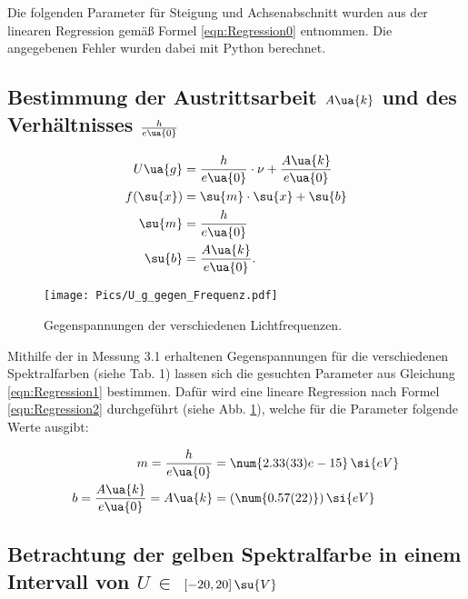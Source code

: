 \newpage

Die folgenden Parameter für Steigung und Achsenabschnitt wurden aus der linearen
Regression gemäß Formel \eqref{eqn:Regression0} entnommen. Die angegebenen Fehler
wurden dabei mit Python berechnet.



\newpage
\newpage

\subsection{Bestimmung der Austrittsarbeit $A\ua{k}$ und des Verhältnisses $\frac{h}{e\ua{0}}$}

\begin{align}
  U\ua{g}   &= \frac{h}{e\ua{0}} \cdot \nu + \frac{A\ua{k}}{e\ua{0}}
  \label{eqn:Regression1} \\
  f(\su{x}) &= \su{m} \cdot \su{x} + \su{b}
  \label{eqn:Regression2} \\
  \su{m}  &= \frac{h}{e\ua{0}}
  \label{eqn:Regression3} \\
  \su{b}  &= \frac{A\ua{k}}{e\ua{0}}.
  \label{eqn:Regression4}
\end{align}

\begin{figure}
  \centering
  \texttt{[image: Pics/U\_g\_gegen\_Frequenz.pdf]}
  \caption{Gegenspannungen der verschiedenen Lichtfrequenzen.}
  \label{fig:Gegenspannung}
\end{figure}

Mithilfe der in Messung 3.1 erhaltenen Gegenspannungen für die verschiedenen
Spektralfarben (siehe Tab. 1) lassen sich die gesuchten
Parameter
aus Gleichung \eqref{eqn:Regression1} bestimmen. Dafür wird eine lineare Regression
nach Formel \eqref{eqn:Regression2} durchgeführt (siehe Abb. \ref{fig:Gegenspannung}),
welche für die Parameter folgende Werte ausgibt:

\begin{align}
  m = \frac{h}{e\ua{0}}                 &= \num{2.33(33)e-15} \, \si{eV}\\
  b = \frac{A\ua{k}}{e\ua{0}} = A\ua{k} &= (\num{0.57(22)}) \, \si{eV}
\end{align}

\newpage

\subsection{Betrachtung der gelben Spektralfarbe in einem Intervall von $U \, \in$ $[-20, 20] \, \su{V}$ }

